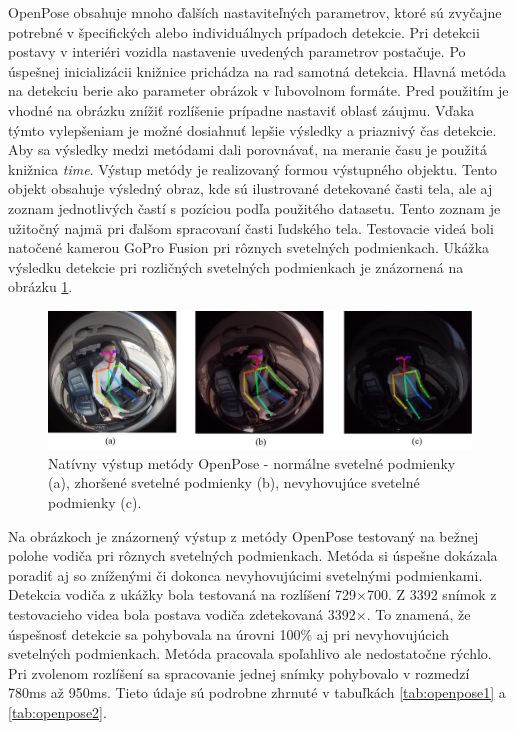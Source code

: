 \documentclass[slovak,master,dept460,male,cpp,cpdeclaration]{diploma}
\begin{document}
OpenPose obsahuje mnoho ďalších nastaviteľných parametrov, ktoré  sú zvyčajne potrebné v špecifických alebo individuálnych prípadoch detekcie. Pri detekcii postavy v interiéri vozidla nastavenie uvedených parametrov postačuje. Po úspešnej inicializácii knižnice prichádza na rad samotná detekcia.  Hlavná metóda na detekciu berie  ako parameter  obrázok v ľubovolnom formáte. Pred použitím je vhodné  na obrázku  znížiť rozlíšenie prípadne  nastaviť oblasť záujmu. Vďaka týmto vylepšeniam je možné dosiahnuť lepšie výsledky  a priaznivý čas detekcie. Aby sa výsledky  medzi metódami dali porovnávať, na meranie času je použitá knižnica \textit{time}. Výstup metódy je realizovaný formou výstupného objektu. Tento objekt obsahuje výsledný obraz, kde sú ilustrované detekované časti tela, ale aj zoznam jednotlivých častí s pozíciou podľa použitého datasetu. Tento zoznam je užitočný najmä pri  ďalšom spracovaní časti ľudského tela. Testovacie videá boli  natočené kamerou GoPro Fusion pri rôznych svetelných podmienkach. Ukážka výsledku detekcie pri rozličných  svetelných podmienkach je  znázornená na  obrázku \ref{fig:op_result}.

\begin{figure}[H]
	\centering
	\includegraphics[width=1\textwidth]{Figures/op_result.png}
	\caption{Natívny výstup metódy OpenPose - normálne svetelné podmienky (a), zhoršené svetelné podmienky (b), nevyhovujúce svetelné podmienky (c).}
	\label{fig:op_result}
\end{figure}

Na obrázkoch je znázornený výstup  z metódy OpenPose testovaný na bežnej polohe vodiča pri rôznych svetelných podmienkach. Metóda si úspešne dokázala poradiť aj so zníženými či dokonca nevyhovujúcimi svetelnými podmienkami. Detekcia vodiča z ukážky bola testovaná na rozlíšení 729$\times$700. Z 3392 snímok z testovacieho videa bola postava vodiča zdetekovaná  3392$\times$. To znamená, že úspešnosť detekcie sa pohybovala na úrovni 100\% aj pri nevyhovujúcich svetelných podmienkach. Metóda pracovala spoľahlivo ale nedostatočne rýchlo. Pri zvolenom rozlíšení sa spracovanie jednej snímky pohybovalo v rozmedzí 780ms až 950ms. Tieto údaje sú podrobne zhrnuté v tabuľkách \ref{tab:openpose1} a \ref{tab:openpose2}.
\end{document}
